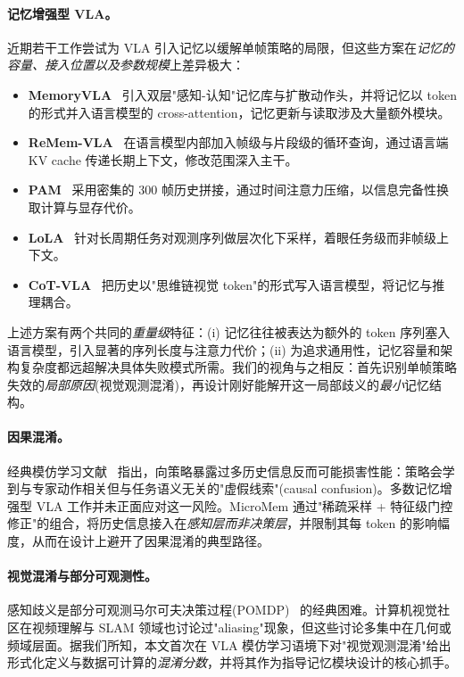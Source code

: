 \documentclass[11pt]{ctexart}
\begin{document}
\paragraph{记忆增强型 VLA。}
近期若干工作尝试为 VLA 引入记忆以缓解单帧策略的局限，但这些方案在\emph{记忆的容量、接入位置以及参数规模}上差异极大：
\begin{itemize}
    \item \textbf{MemoryVLA}~\cite{shi2025memoryvla} 引入双层"感知-认知"记忆库与扩散动作头，并将记忆以 token 的形式并入语言模型的 cross-attention，记忆更新与读取涉及大量额外模块。
    \item \textbf{ReMem-VLA}~\cite{remem2025} 在语言模型内部加入帧级与片段级的循环查询，通过语言端 KV cache 传递长期上下文，修改范围深入主干。
    \item \textbf{PAM}~\cite{pam2025} 采用密集的 300 帧历史拼接，通过时间注意力压缩，以信息完备性换取计算与显存代价。
    \item \textbf{LoLA}~\cite{lola2025} 针对长周期任务对观测序列做层次化下采样，着眼任务级而非帧级上下文。
    \item \textbf{CoT-VLA}~\cite{zhao2025cotvla} 把历史以"思维链视觉 token"的形式写入语言模型，将记忆与推理耦合。
\end{itemize}
上述方案有两个共同的\emph{重量级}特征：(i) 记忆往往被表达为额外的 token 序列塞入语言模型，引入显著的序列长度与注意力代价；(ii) 为追求通用性，记忆容量和架构复杂度都远超解决具体失败模式所需。我们的视角与之相反：首先识别单帧策略失效的\emph{局部原因}(视觉观测混淆)，再设计刚好能解开这一局部歧义的\emph{最小}记忆结构。

\paragraph{因果混淆。}
经典模仿学习文献~\cite{dehaan2019causal} 指出，向策略暴露过多历史信息反而可能损害性能：策略会学到与专家动作相关但与任务语义无关的"虚假线索"(causal confusion)。多数记忆增强型 VLA 工作并未正面应对这一风险。MicroMem 通过"稀疏采样 + 特征级门控修正"的组合，将历史信息接入在\emph{感知层而非决策层}，并限制其每 token 的影响幅度，从而在设计上避开了因果混淆的典型路径。

\paragraph{视觉混淆与部分可观测性。}
感知歧义是部分可观测马尔可夫决策过程(POMDP)~\cite{kaelbling1998planning} 的经典困难。计算机视觉社区在视频理解与 SLAM 领域也讨论过"aliasing"现象，但这些讨论多集中在几何或频域层面。据我们所知，本文首次在 VLA 模仿学习语境下对"视觉观测混淆"给出形式化定义与数据可计算的\emph{混淆分数}，并将其作为指导记忆模块设计的核心抓手。
\end{document}
